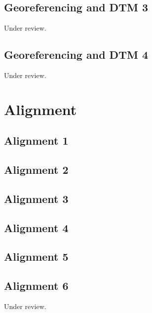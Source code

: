 \documentclass{scrartcl}
\begin{document}
\subsection{Georeferencing and DTM 3} %
\label{sec:georef_tin_3}
Under review.%
\clearpage

\subsection{Georeferencing and DTM 4} %
\label{sec:georef_tin_4}
Under review.%
\clearpage

\section{Alignment}

\subsection{Alignment 1}
\label{sec:align_1}
\clearpage

\subsection{Alignment 2}
\label{sec:align_2}
\clearpage

\subsection{Alignment 3}
\label{sec:align_3}
\clearpage

\subsection{Alignment 4}
\label{sec:align_4}
\clearpage

\subsection{Alignment 5}
\label{sec:align_5}
\clearpage

\subsection{Alignment 6} %
\label{sec:align_6}
Under review.%
\clearpage
\end{document}

